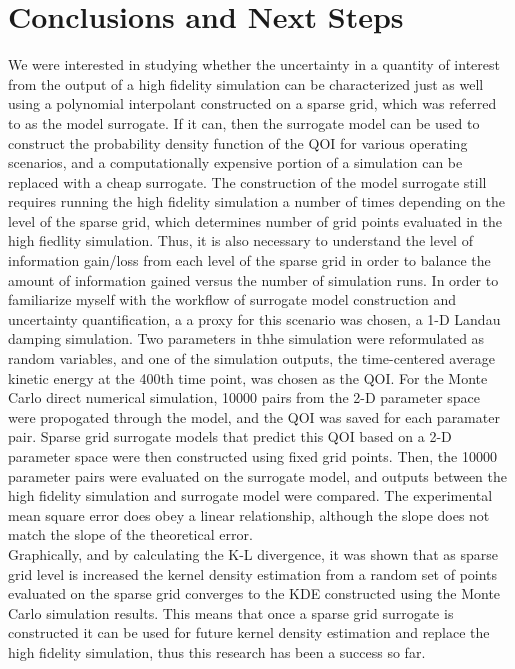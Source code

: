 \documentclass{article}
\begin{document}
\section{Conclusions and Next Steps }
We were interested in studying whether the uncertainty in a quantity of interest from the output of a high fidelity simulation can be characterized just as well using a polynomial interpolant constructed on a sparse grid, which was referred to as the model surrogate. If it can, then the surrogate model can be used to construct the probability density function of the QOI for various operating scenarios, and a computationally expensive portion of a simulation can be replaced with a cheap surrogate. The construction of the model surrogate still requires running the high fidelity simulation a number of times depending on the level of the sparse grid, which determines number of grid points evaluated in the high fiedlity simulation. Thus, it is also necessary to understand the level of information gain/loss from each level of the sparse grid in order to balance the amount of information gained versus the number of simulation runs. In order to familiarize myself with the workflow of surrogate model construction and uncertainty quantification, a a proxy for this scenario was chosen, a 1-D Landau damping simulation. Two parameters in thhe simulation were reformulated as random variables, and one of the simulation outputs, the time-centered average kinetic energy at the 400th time point, was chosen as the QOI. For the Monte Carlo direct numerical simulation, 10000 pairs from the 2-D parameter space were propogated through the model, and the QOI was saved for each paramater pair. Sparse grid surrogate models that predict this QOI based on a 2-D parameter space were then constructed using fixed grid points. Then, the 10000 parameter pairs were evaluated on the surrogate model, and outputs between the high fidelity simulation and surrogate model were compared. The experimental mean square error does obey a linear relationship, although the slope does not match the slope of the theoretical error.\\
Graphically, and by calculating the K-L divergence, it was shown that as sparse grid level is increased the kernel density estimation from a random set of points  evaluated on the sparse grid converges to the KDE constructed using the Monte Carlo simulation results. This means that once a sparse grid surrogate is constructed it can be used for future kernel density estimation and replace the high fidelity simulation, thus this research has been a success so far.\\
\end{document}
